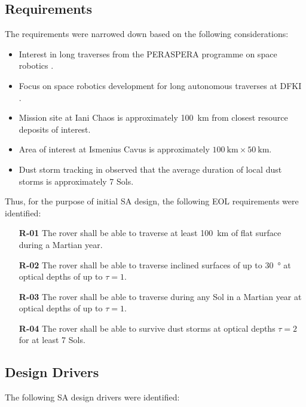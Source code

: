 \clearpage
\subsection{Requirements}
\label{sec:RequirementsAndDesignDrivers:Requirements}
The requirements were narrowed down based on the following considerations:
\begin{itemize}
    \item Interest in long traverses from the PERASPERA programme on space robotics .
    \item Focus on space robotics development for long autonomous traverses at \ac{DFKI}  .
    \item Mission site at Iani Chaos is approximately \SI{100}{\kilo\meter} from closest resource deposits of interest.
    \item Area of interest at Ismenius Cavus is approximately $\SI{100}{\kilo\meter} \times \SI{50}{\kilo\meter}$.
    \item Dust storm tracking in  observed that the average duration of local dust storms is approximately 7 Sols.
\end{itemize}

Thus, for the purpose of initial \ac{SA} design, the following \ac{EOL} requirements were identified:

\begin{itemize}
    \item[\textbf{R-01}] The rover shall be able to traverse at least \SI{100}{\kilo\meter} of flat surface during a Martian year.
    \item[\textbf{R-02}] The rover shall be able to traverse inclined surfaces of up to \SI{30}{\degree} at optical depths of up to $\tau = 1$.
    \item[\textbf{R-03}] The rover shall be able to traverse during any Sol in a Martian year at optical depths of up to $\tau = 1$.
    \item[\textbf{R-04}] The rover shall be able to survive dust storms at optical depths $\tau = 2$ for at least 7 Sols.
\end{itemize}


\subsection{Design Drivers}
\label{sec:RequirementsAndDesignDrivers:DesignDrivers}
The following \ac{SA} design drivers were identified:

